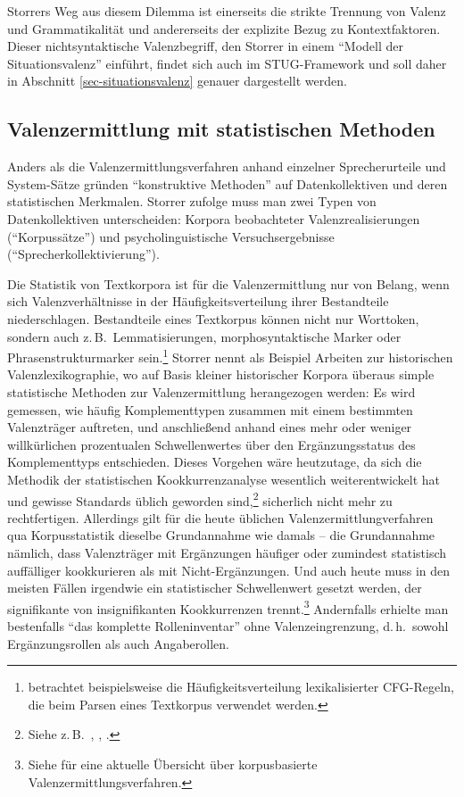 Storrers Weg aus diesem Dilemma ist einerseits die strikte Trennung von Valenz und Grammatikalität und andererseits der explizite Bezug zu Kontextfaktoren. Dieser nichtsyntaktische Valenzbegriff, den Storrer in einem "`Modell der Situationsvalenz"' einführt, findet sich auch im STUG-Framework und soll daher in Abschnitt \ref{sec-situationsvalenz} genauer dargestellt werden. 



\subsection{Valenzermittlung mit statistischen Methoden} \label{sec-valenzermittlung-konstruktiv}

Anders als die Valenzermittlungsverfahren anhand einzelner Sprecherurteile und System-Sät\-ze gründen "`konstruktive Methoden"' \citep[228ff]{Storrer:92} auf Datenkollektiven und deren statistischen Merkmalen. Storrer zufolge muss man zwei Typen von Datenkollektiven unterscheiden: Korpora beobachteter Valenzrealisierungen ("`Korpussätze"') und psycholinguistische Versuchsergebnisse ("`Sprecherkollektivierung"'). 

Die Statistik von Textkorpora ist für die Valenzermittlung nur von Belang, wenn sich Valenzverhältnisse in der Häufigkeitsverteilung ihrer Bestandteile niederschlagen. Bestandteile eines Textkorpus können nicht nur Worttoken, sondern auch z.\,B.\ Lemmatisierungen, morphosyntaktische Marker oder Phrasenstrukturmarker sein.\footnote{\cite{SchulteImWalde:02} betrachtet beispielsweise die Häufigkeitsverteilung lexikalisierter CFG-Regeln, die beim Parsen eines Textkorpus verwendet werden.} Storrer nennt als Beispiel Arbeiten zur historischen Valenzlexikographie, wo auf Basis kleiner historischer Korpora überaus simple statistische Methoden zur Valenzermittlung herangezogen werden: Es wird gemessen, wie häufig Komplementtypen zusammen mit einem bestimmten Valenzträger auftreten, und anschlie\ss end anhand eines mehr oder weniger willkürlichen prozentualen Schwellenwertes über den Ergänzungsstatus des Komplementtyps entschieden. Dieses Vorgehen wäre heutzutage, da sich die Methodik der statistischen Kookkurrenzanalyse wesentlich weiterentwickelt hat und gewisse Standards üblich geworden sind,\footnote{Siehe z.\,B.\ \cite{Lemnitzer:97}, \cite{Krenn:99}, \cite{Evert:05}.} sicherlich nicht mehr zu rechtfertigen. Allerdings gilt für die heute üblichen Valenzermittlungverfahren qua Korpusstatistik dieselbe Grundannahme wie damals -- die Grundannahme nämlich, dass Valenzträger mit Ergänzungen häufiger oder zumindest statistisch auffälliger kookkurieren als mit Nicht-Ergänzungen. Und auch heute muss in den meisten Fällen irgendwie ein statistischer Schwellenwert gesetzt werden, der signifikante von insignifikanten Kookkurrenzen trennt.\footnote{Siehe \cite{SchulteImWalde:09} für eine aktuelle Übersicht über korpusbasierte Valenzermittlungsverfahren.} Andernfalls erhielte man bestenfalls "`das komplette Rolleninventar"' \citep[232]{Storrer:92} ohne Valenzeingrenzung, d.\,h.\ sowohl Ergänzungsrollen als auch Angaberollen.

